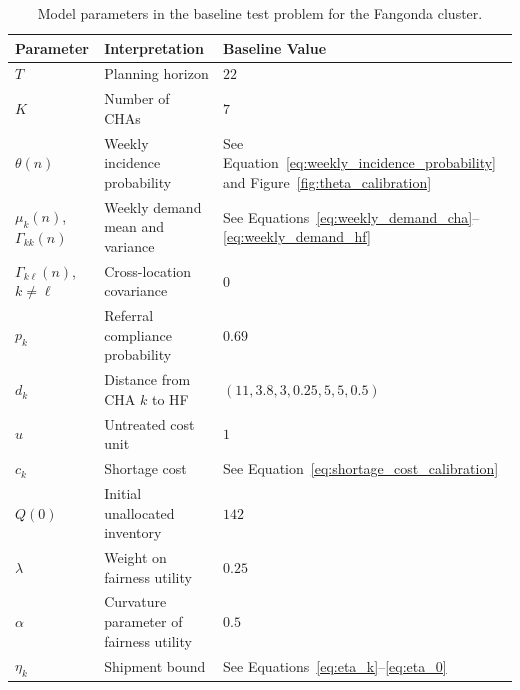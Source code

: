 \begin{table}[!ht]
\centering
\small
\caption{Model parameters in the baseline test problem for the Fangonda cluster.}
\label{tab:baseline_parameters}
\begin{tabular}{lll}
\toprule
Parameter & Interpretation & Baseline Value \\
\midrule
$T$ & Planning horizon & $22$ \\
$K$ & Number of CHAs & $7$ \\
$\theta(n)$ & Weekly incidence probability & See Equation~\eqref{eq:weekly_incidence_probability} and Figure~\ref{fig:theta_calibration}\\
$\mu_k(n)$, $\Gamma_{kk}(n)$ & Weekly demand mean and variance & See Equations~\eqref{eq:weekly_demand_cha}--\eqref{eq:weekly_demand_hf}\\
$\Gamma_{k\ell}(n)$, $k\neq \ell$ & Cross-location covariance & $0$ \\
$p_k$ & Referral compliance probability & $0.69$ \\
$d_k$ & Distance from CHA $k$ to HF & $(11,3.8,3,0.25,5,5,0.5)$ \\
$u$ & Untreated cost unit & $1$ \\
$c_k$ & Shortage cost & See Equation~\eqref{eq:shortage_cost_calibration} \\
$Q(0)$ & Initial unallocated inventory & $142$ \\
$\lambda$ & Weight on fairness utility & $0.25$ \\
$\alpha$ & Curvature parameter of fairness utility & $0.5$ \\
$\eta_k$ & Shipment bound & See Equations~\eqref{eq:eta_k}--\eqref{eq:eta_0} \\
\bottomrule
\end{tabular}
\end{table}
